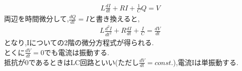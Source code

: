 \documentclass{jsarticle}
\begin{document}
\begin{eqnarray*}
L\frac{dI}{dt}+RI + \frac{1}{C}Q = V
\end{eqnarray*}
両辺を時間微分して,$\frac{dQ}{dt}=I$と書き換えると,
\begin{eqnarray*}
L\frac{d^2 I}{dt^2}+R\frac{dI}{dt}+\frac{I}{C} = \frac{dV}{dt}
\end{eqnarray*}
となり,Iについての2階の微分方程式が得られる.　\\
とくに$\frac{dV}{dt}=0$でも電流は振動する. \\
抵抗が0であるときはLC回路といい(ただし$\frac{dV}{dt}=const.$),電流Iは単振動する.
\end{document}
